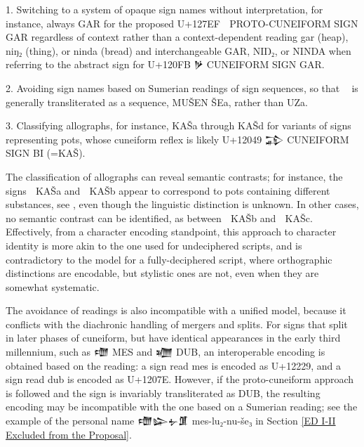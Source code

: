 1. Switching to a system of opaque sign names without interpretation,
for instance, always GAR for the proposed U+127EF 𒟯 PROTO-CUNEIFORM
SIGN GAR regardless of context rather than a context-dependent reading
gar (heap), niŋ₂ (thing), or ninda (bread) and interchangeable GAR,
NIŊ₂, or NINDA when referring to the abstract sign for U+120FB 𒃻
CUNEIFORM SIGN GAR.

2. Avoiding sign names based on Sumerian readings of sign sequences,
so that 𒤡𒨟 is generally transliterated as a sequence, MUŠEN ŠEa,
rather than UZa.

3. Classifying allographs, for instance, KAŠa through KAŠd for
variants of signs representing pots, whose cuneiform reflex is likely
U+12049 𒁉 CUNEIFORM SIGN BI (=KAŠ).

The classification of allographs can reveal semantic contrasts; for
instance, the signs 𒢄 KAŠa and 𒢅 KAŠb appear to correspond to pots
containing different substances, see \cite[168]{Englund1998}, even though
the linguistic distinction is unknown. In other cases, no semantic
contrast can be identified, as between 𒢅 KAŠb and 𒢇 KAŠc. Effectively,
from a character encoding standpoint, this approach to character
identity is more akin to the one used for undeciphered scripts, and is
contradictory to the model for a fully-deciphered script, where
orthographic distinctions are encodable, but stylistic ones are not,
even when they are somewhat systematic.

The avoidance of readings is also incompatible with a unified model,
because it conflicts with the diachronic handling of mergers and
splits. For signs that split in later phases of cuneiform, but have
identical appearances in the early third millennium, such as 𒈩 MES and
𒁾 DUB, an interoperable encoding is obtained based on the reading: a
sign read mes is encoded as U+12229, and a sign read dub is encoded as
U+1207E. However, if the proto-cuneiform approach is followed and the
sign is invariably transliterated as DUB, the resulting encoding may
be incompatible with the one based on a Sumerian reading; see the
example of the personal name 𒈩𒇽𒉡𒂠 mes-lu₂-nu-še₃ in Section \ref{ED
I-II Excluded from the Proposal}.

